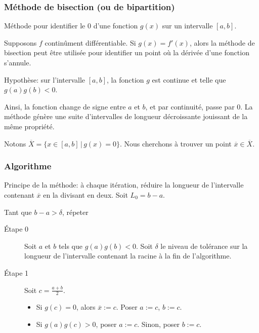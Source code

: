 \documentclass[usepdftitle=false]{beamer}
\def\red{\color{red}}
\begin{document}
\begin{frame}
\frametitle{Méthode de bisection (ou de bipartition)}

Méthode pour identifier le 0 d'une fonction $g(x)$ sur un intervalle $[a, b]$.

\mbox{}

Supposons $f$ continûment différentiable.
Si $g(x) = f'(x)$, alors la méthode de bisection peut être utilisée pour identifier un point où la dérivée d’une fonction s’annule.

\mbox{}

{\red Hypothèse}: sur l'intervalle $[a, b]$, la fonction $g$ est continue et telle que
$g(a)g(b) < 0$.

\mbox{}

Ainsi, la fonction change de signe entre $a$ et $b$, et par continuité, passe par 0.
La méthode génère une suite d'intervalles de longueur décroissante
jouissant de la même propriété.

\mbox{}

Notons $\overline{X} = \lbrace x \in [a,b] \,|\, g(x) = 0 \rbrace$. Nous cherchons à trouver un point $\overline{x} \in \overline{X}$.
	
\end{frame}

\begin{frame}
\frametitle{Algorithme}

Principe de la méthode: à chaque itération, réduire la longueur de l'intervalle contenant $\overline{x}$ en la divisant en deux.
Soit $L_0 = b-a$.

\mbox{}

Tant que $b-a > \delta$, répeter
\begin{description}
\item[Étape 0]
Soit $a$ et $b$ tels que $g(a)g(b) < 0$. Soit $\delta$ le niveau de tolérance
sur la longueur de l'intervalle contenant la racine à la fin de l'algorithme.
\item[Étape 1]
Soit $c = \frac{a+b}{2}$.
\begin{itemize}
\item
Si $g(c) = 0$, alors $\overline{x} := c$. Poser $a := c$, $b := c$.
\item
Si $g(a)g(c) > 0$, poser $a := c$.
Sinon, poser $b := c$.
\end{itemize}

\end{description}
	
\end{frame}
\end{document}
